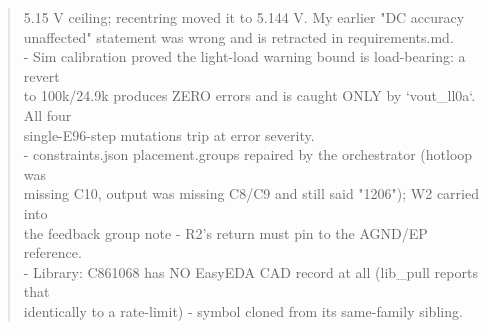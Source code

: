 \documentclass[11pt,a4paper]{article}
\begin{document}
\begin{quote}
  5.15 V ceiling; recentring moved it to 5.144 V. My earlier "DC accuracy\\
  unaffected" statement was wrong and is retracted in requirements.md.\\
- Sim calibration proved the light-load warning bound is load-bearing: a revert\\
  to 100k/24.9k produces ZERO errors and is caught ONLY by `vout\_ll0a`. All four\\
  single-E96-step mutations trip at error severity.\\
- constraints.json placement.groups repaired by the orchestrator (hotloop was\\
  missing C10, output was missing C8/C9 and still said "1206"); W2 carried into\\
  the feedback group note - R2's return must pin to the AGND/EP reference.\\
- Library: C861068 has NO EasyEDA CAD record at all (lib\_pull reports that\\
  identically to a rate-limit) - symbol cloned from its same-family sibling.
\end{quote}
\end{document}
